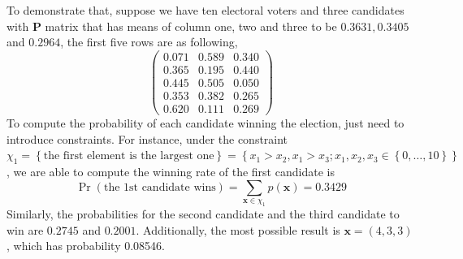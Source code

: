 \documentclass[12pt]{article}
\newcommand{\Pmat}{\mathbf{P}}
\newcommand{\xvec}{\boldsymbol{x}}
\begin{document}
To demonstrate that, suppose we have ten electoral voters and three candidates with $\Pmat$ matrix that has means of column one, two and three to be $0.3631,0.3405$ and $0.2964$, the first five rows are as following,
\begin{equation*}
\begin{pmatrix}
0.071 & 0.589 & 0.340\\
0.365 & 0.195 & 0.440\\
0.445 & 0.505 & 0.050\\
0.353 & 0.382 & 0.265\\
0.620 & 0.111 & 0.269
    \end{pmatrix}
\end{equation*}
To compute the probability of each candidate winning the election, just need to introduce constraints. For instance, under the constraint $\chi_1 = \left\{\text{the first element is the largest one}\right\} = \left\{x_1>x_2, x_1>x_3; x_1, x_2,x_3 \in \left\{0,\dots,10\right\}\right\}$, we are able to compute the winning rate of the first candidate is
\begin{equation*}
\Pr(\text{the 1st candidate wins}) = \sum_{\xvec \in \chi_{1}} p(\xvec) = 0.3429
\end{equation*}
Similarly, the probabilities for the second candidate and the third candidate to win are $0.2745$ and $0.2001$. Additionally, the most possible result is $\xvec = (4,3,3)$, which has probability 0.08546.




\end{document}
